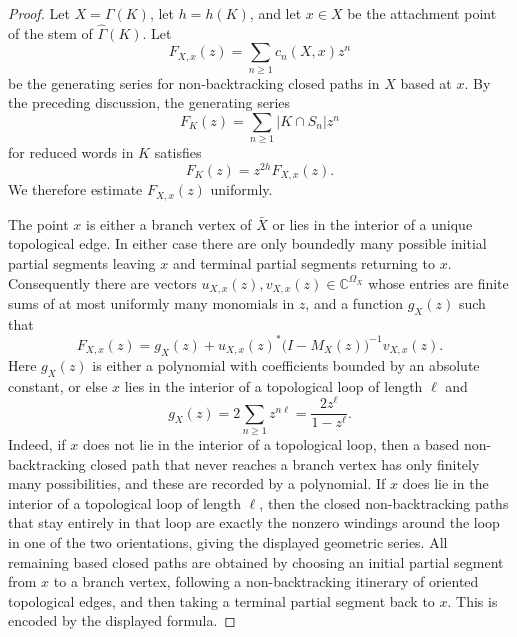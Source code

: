 \documentclass{amsproc}
\begin{document}
\begin{proof}
Let $X=\Gamma(K)$, let $h=h(K)$, and let $x\in X$ be the attachment point of
the stem of $\widehat\Gamma(K)$.  Let
\[
        F_{X,x}(z)=\sum_{n\geq 1} c_n(X,x)z^n
\]
be the generating series for non-backtracking closed paths in $X$ based at $x$.
By the preceding discussion, the generating series
\[
        F_K(z)=\sum_{n\geq 1}|K\cap S_n|z^n
\]
for reduced words in $K$ satisfies
\[
        F_K(z)=z^{2h}F_{X,x}(z).
\]
We therefore estimate $F_{X,x}(z)$ uniformly.

The point $x$ is either a branch vertex
of $\bar X$ or lies in the interior of a unique topological edge.  In
either case there are only boundedly many possible initial partial segments
leaving $x$ and terminal partial segments returning to $x$.  Consequently
there are vectors $u_{X,x}(z),v_{X,x}(z)\in \mathbb C^{\Omega_X}$ whose entries are
finite sums of at most uniformly many monomials in $z$, and a function $g_X(z)$
such that
\[
        F_{X,x}(z)=g_X(z)+u_{X,x}(z)^\ast\bigl(I-M_X(z)\bigr)^{-1}v_{X,x}(z).
\]
Here $g_X(z)$ is either a polynomial with coefficients bounded by an absolute
constant, or else $x$ lies in the interior of a topological loop of length
$\ell$ and
\[
        g_X(z)=2\sum_{n\geq 1} z^{n\ell}=\frac{2z^\ell}{1-z^\ell}.
\]
Indeed, if $x$ does not lie in the interior of a topological loop, then a
based non-backtracking closed path that never reaches a branch vertex has only
finitely many possibilities, and these are recorded by a polynomial.  If $x$
does lie in the interior of a topological loop of length $\ell$, then the closed
non-backtracking paths that stay entirely in that loop are exactly the nonzero
windings around the loop in one of the two orientations, giving the displayed
geometric series.  All remaining based closed paths are obtained by choosing an
initial partial segment from $x$ to a branch vertex, following a
non-backtracking itinerary of oriented topological edges, and then taking a
terminal partial segment back to $x$.  This is encoded by the displayed
formula.


\end{proof}
\end{document}
